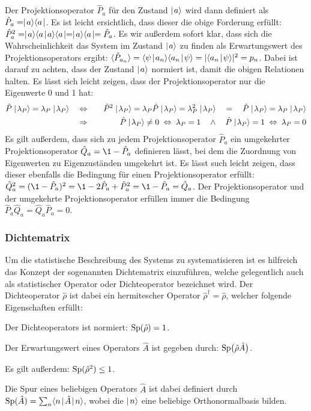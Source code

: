 Der Projektionsoperator $\hat{P}_a$ für den Zustand $\mid\!\!\!\,\,{a}\rangle$ wird dann definiert als $\hat{P}_a=\mid\!\!\!\,\,{a}\rangle\langle{a}\!\!\!\,\,\mid$. Es ist leicht ersichtlich, dass dieser die obige Forderung erfüllt: $\hat{P}_a^2=\ket{a}\braket{a}{a}\bra{a}=\ket{a}\bra{a}=\hat{P}_a$. Es wir außerdem sofort klar, dass sich die Wahrscheinlichkeit das System im Zustand $\mid\!\!\!\,\,{a}\rangle$ zu finden als Erwartungswert des Projektionsoperators ergibt: $\EW{\hat{P}_{a_n}}=\braket{\psi}{a_n}\braket{a_n}{\psi}=|\braket{a_n}{\psi}|^2=p_n$. Dabei ist darauf zu achten, dass der Zustand $\mid\!\!\!\,\,{a}\rangle$ normiert ist, damit die obigen Relationen halten. Es lässt sich leicht zeigen, dass der Projektionsoperator nur die Eigenwerte 0 und 1 hat: 
\begin{eqnarray*}
	\hat{P} \ket{\lambda_P} = \lambda_P \ket{\lambda_P} &\quad\Leftrightarrow\quad& \hat{P}^2 \ket{\lambda_P} = \lambda_P\hat{P}\ket{\lambda_P}= \lambda_P^2 \ket{\lambda_P} \quad=\quad \hat{P}\ket{\lambda_P}=\lambda_P \ket{\lambda_P}
	\\
	&\quad\Rightarrow\quad& \hat{P}\ket{\lambda_P} \neq 0 \;\Leftrightarrow\; \lambda_P = 1 \quad\land\quad \hat{P}\ket{\lambda_P} = 1 \;\Leftrightarrow\; \lambda_P=0
\end{eqnarray*}
Es gilt außerdem, dass sich zu jedem Projektionsoperator $\hat{P}_a$ ein umgekehrter Projektionsoperator $\hat{Q}_a=\1-\hat{P}_a$ definieren lässt, bei dem die Zuordnung von Eigenwerten zu Eigenzuständen umgekehrt ist. Es lässt such leicht zeigen, dass dieser ebenfalls die Bedingung für einen Projektionsoperator erfüllt: $\hat{Q}_a^2=(\1-\hat{P}_a)^2=\1-2\hat{P}_a+\hat{P}_a^2=\1-\hat{P}_a=\hat{Q}_a$. Der Projektionsoperator und der umgekehrte Projektionsoperator erfüllen immer die Bedingung $\hat{P}_a \hat{Q}_a=\hat{Q}_a \hat{P}_a=0$. 



\subsubsection{Dichtematrix}

Um die statistische Beschreibung des Systems zu systematisieren ist es hilfreich das Konzept der sogenannten Dichtematrix einzuführen, welche gelegentlich auch als statistischer Operator oder Dichteoperator bezeichnet wird. Der Dichteoperator $\hat{\rho}$ ist dabei ein hermitescher Operator $\hat{\rho}^{\dagger}=\hat{\rho}$, welcher folgende Eigenschaften erfüllt: 
\begin{itemize1}
	\item Der Dichteoperators ist normiert: $\text{Sp}(\hat{\rho})=1$. 
	\item Der Erwartungswert eines Operators $\hat{A}$ ist gegeben durch: $\text{Sp}\big(\hat{\rho}\hat{A}\big)$. 
	\item Es gilt außerdem: $\text{Sp}(\hat{\rho}^2)\leq1$. 
\end{itemize1}	
Die Spur eines beliebigen Operators $\hat{A}$ ist dabei definiert durch $\Sp(\hat{A})=\sum_n \bracket{n}{\hat{A}}{n}$, wobei die $\mid\!\!\!\,\,{n}\rangle$ eine beliebige Orthonormalbasis bilden. 


